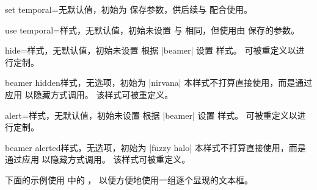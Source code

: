 \begin{docTcbKey}[][doc new={2025-07-07}]{set temporal}{=}{无默认值，初始为 \brackets{}\brackets{}\brackets{}}
  保存参数，供后续与  配合使用。
\end{docTcbKey}

\begin{docTcbKey}[][doc new={2025-07-07}]{use temporal}{=}{样式，无默认值，初始未设置}
  与  相同，但使用由  保存的参数。
\end{docTcbKey}


\begin{docTcbKey}[][doc new={2019-03-01}]{hide}{=}{样式，无默认值，初始未设置}
  根据 |beamer|  设置  样式。
   可被重定义以进行定制。
\end{docTcbKey}

\begin{docTcbKey}[][doc new={2019-03-01}]{beamer hidden}{}{样式，无选项，初始为 |nirvana|}
  本样式不打算直接使用，而是通过应用  以隐藏方式调用。
  该样式可被重定义。
\begin{dispListing}
\end{dispListing}
\end{docTcbKey}

\begin{docTcbKey}[][doc new={2019-03-01}]{alert}{=}{样式，无默认值，初始未设置}
  根据 |beamer|  设置  样式。
   可被重定义以进行定制。
\end{docTcbKey}


\begin{docTcbKey}[][doc new={2019-03-01}]{beamer alerted}{}{样式，无选项，初始为 |fuzzy halo|}
  本样式不打算直接使用，而是通过应用  以隐藏方式调用。
  该样式可被重定义。
\begin{dispListing}
\end{dispListing}
\end{docTcbKey}


\clearpage

下面的示例使用  中的 ，
以便方便地使用一组逐个显现的文本框。


